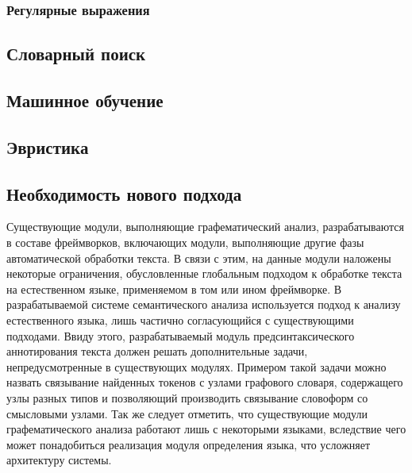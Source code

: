 \subsubsection{Регулярные выражения}
\subsection{Словарный поиск}
\subsection{Машинное обучение}
\subsection{Эвристика}

\subsection{Необходимость нового подхода}
Существующие модули, выполняющие графематический анализ, разрабатываются в составе фреймворков, включающих модули, выполняющие другие фазы автоматической обработки текста. В связи с этим, на данные модули наложены некоторые ограничения, обусловленные глобальным подходом к обработке текста на естественном языке, применяемом в том или ином фреймворке. В разрабатываемой системе семантического анализа используется подход к анализу естественного языка, лишь частично согласующийся с существующими подходами. Ввиду этого, разрабатываемый модуль предсинтаксического аннотирования текста должен решать дополнительные задачи, непредусмотренные в существующих модулях. Примером такой задачи можно назвать связывание найденных токенов с узлами графового словаря, содержащего узлы разных типов и позволяющий производить связывание словоформ со смысловыми узлами. Так же следует отметить, что существующие модули графематического анализа работают лишь с некоторыми языками, вследствие чего может понадобиться реализация модуля определения языка, что усложняет архитектуру системы.